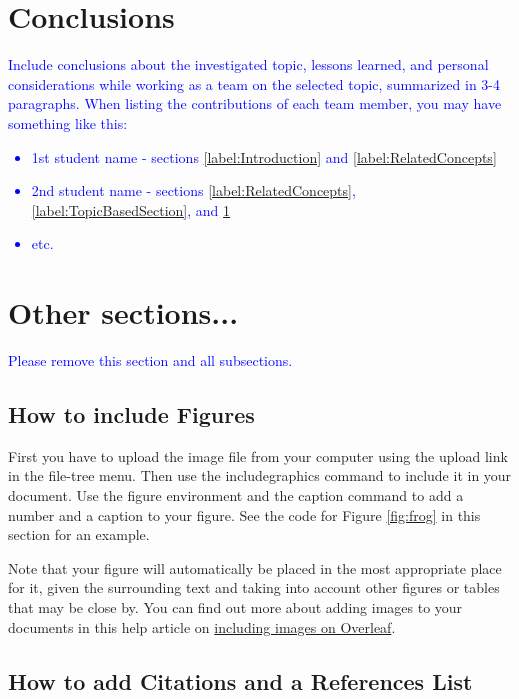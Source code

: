 \documentclass{article}
\begin{document}
\section{Conclusions}
\label{label:Conclusions}

\textcolor{blue}{Include conclusions about the investigated topic, lessons learned, and personal considerations while working as a team on the selected topic, summarized in 3-4 paragraphs. When listing the contributions of each team member, you may have something like this:}

\textcolor{blue}{\begin{itemize}
\vspace{-0.5cm}
    \item 1st student name - sections \ref{label:Introduction} and \ref{label:RelatedConcepts}
    \item 2nd student name - sections \ref{label:RelatedConcepts}, \ref{label:TopicBasedSection}, and \ref{label:Conclusions}
    \item etc.
\end{itemize}}

\section{Other sections...}

\textcolor{blue}{Please remove this section and all subsections.}
\subsection{How to include Figures}

First you have to upload the image file from your computer using the upload link in the file-tree menu. Then use the includegraphics command to include it in your document. Use the figure environment and the caption command to add a number and a caption to your figure. See the code for Figure \ref{fig:frog} in this section for an example.

Note that your figure will automatically be placed in the most appropriate place for it, given the surrounding text and taking into account other figures or tables that may be close by. You can find out more about adding images to your documents in this help article on \href{https://www.overleaf.com/learn/how-to/Including_images_on_Overleaf}{including images on Overleaf}.


\subsection{How to add Citations and a References List}
\end{document}
